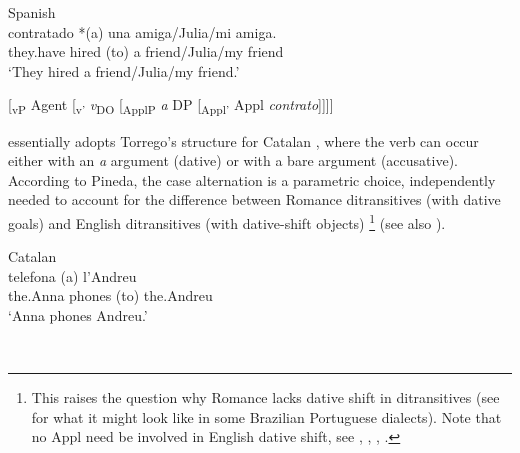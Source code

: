 \documentclass[output=paper]{langscibook}
\begin{document}
\ea\label{ex:manzini:2}
{Spanish \citep{Torrego2010}}\\
     {contratado}  {*(a)} {una} {amiga/Julia/mi} {amiga.}\\
they.have   hired      (to) a friend/Julia/my friend\\
\glt ‘They hired a friend/Julia/my friend.’
\z 

\ea\label{ex:manzini:}
[\textsubscript{vP} Agent [\textsubscript{v’} \textit{v}\textsubscript{DO} [\textsubscript{ApplP} \textit{a} DP [\textsubscript{Appl’} Appl \textit{contrato}]]]]\\
\z

\citet[359-360]{Pineda2016} essentially adopts Torrego’s structure for Catalan , where the verb can occur either with an \textit{a} argument (dative) or with a bare argument (accusative). According to Pineda, the case alternation is a parametric choice, independently needed to account for the difference between Romance ditransitives (with dative goals) and English ditransitives (with dative-shift objects){} \footnote{This raises the question why Romance lacks dative shift in ditransitives (see \citet{Salles2016} for what it might look like in some Brazilian Portuguese dialects). Note that no Appl need be involved in English dative shift, see \citet{Kayne1984}, \citet{Pesetsky1995}, \citet{Harley2002}, \citet{BeckJohnson2005}.} (see also \citealt{Pineda2014}).

\ea\label{ex:manzini:}
{Catalan \citep{Pineda2016}}\\
   {telefona}   {(a)} {l’Andreu}\\
the.Anna   phones   (to) the.Andreu\\
\glt ‘Anna phones Andreu.’
  \z

\ea\label{ex:manzini:}
{}\\
\z
\end{document}
